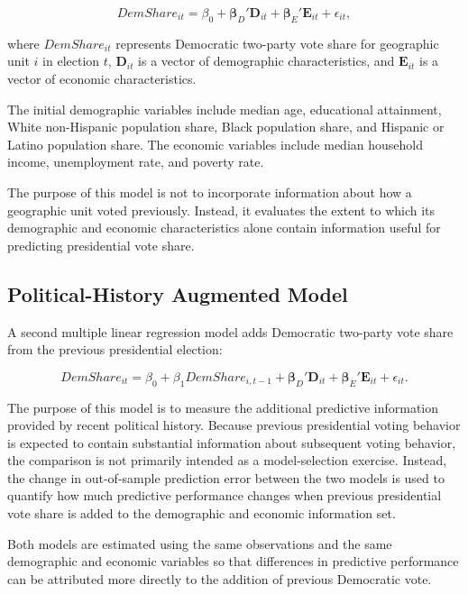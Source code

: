 \documentclass[12pt]{article}
\begin{document}
	\begin{equation}
		DemShare_{it}
		=
		\beta_0
		+
		\boldsymbol{\beta}_{D}'\mathbf{D}_{it}
		+
		\boldsymbol{\beta}_{E}'\mathbf{E}_{it}
		+
		\epsilon_{it},
	\end{equation}
	
	where $DemShare_{it}$ represents Democratic two-party vote share for
	geographic unit $i$ in election $t$, $\mathbf{D}_{it}$ is a vector of
	demographic characteristics, and $\mathbf{E}_{it}$ is a vector of
	economic characteristics.
	
	The initial demographic variables include median age, educational
	attainment, White non-Hispanic population share, Black population
	share, and Hispanic or Latino population share. The economic variables
	include median household income, unemployment rate, and poverty rate.
	
	The purpose of this model is not to incorporate information
	about how a geographic unit voted previously. Instead, it evaluates
	the extent to which its demographic and economic characteristics alone
	contain information useful for predicting presidential vote share.
	
	
	\subsection{Political-History Augmented Model}
	
	A second multiple linear regression model adds Democratic
	two-party vote share from the previous presidential election:
	
	\begin{equation}
		DemShare_{it}
		=
		\beta_0
		+
		\beta_1 DemShare_{i,t-1}
		+
		\boldsymbol{\beta}_{D}'\mathbf{D}_{it}
		+
		\boldsymbol{\beta}_{E}'\mathbf{E}_{it}
		+
		\epsilon_{it}.
	\end{equation}
	
	The purpose of this model is to measure the additional
	predictive information provided by recent political history. Because
	previous presidential voting behavior is expected to contain substantial
	information about subsequent voting behavior, the comparison is not
	primarily intended as a model-selection exercise. Instead, the change
	in out-of-sample prediction error between the two models is used
	to quantify how much predictive performance changes when previous
	presidential vote share is added to the demographic and economic
	information set.
	
	Both models are estimated using the same observations and the
	same demographic and economic variables so that differences in
	predictive performance can be attributed more directly to the addition
	of previous Democratic vote. 
	
\end{document}
